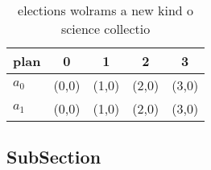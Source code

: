 \documentclass[a4paper]{article}
\begin{document}
\begin{table}
\begin{adjustbox}{width=0.7\columnwidth}
\begin{tabular}{|l|l|l|l|l|}
\hline
\textbf{plan} & \multicolumn{1}{c|}{\textbf{0}} & \multicolumn{1}{c|}{\textbf{1}} & \multicolumn{1}{c|}{\textbf{2}} & \multicolumn{1}{c|}{\textbf{3}} \\ \hline
\textbf{$a_0$}  & (0,0) & (1,0) & (2,0) & (3,0) \\ \hline
\textbf{$a_1$}  & (0,0) & (1,0) & (2,0) & (3,0) \\ \hline
\end{tabular}
\end{adjustbox}
\caption{ elections wolrams a new kind o science collectio
}
\end{table}

\subsection{SubSection}
\end{document}
